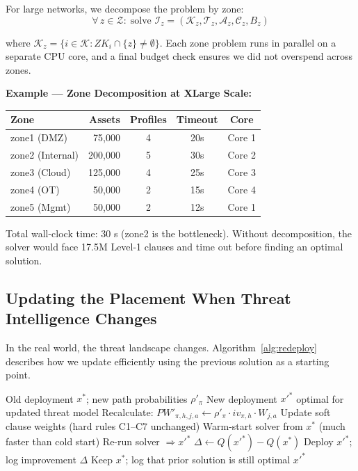 \documentclass[journal]{IEEEtran}
\newcommand{\calK}{\mathcal{K}}
\newcommand{\calT}{\mathcal{T}}
\newcommand{\calA}{\mathcal{A}}
\newcommand{\calZ}{\mathcal{Z}}
\newcommand{\calC}{\mathcal{C}}
\begin{document}
For large networks, we decompose the problem by zone:
\begin{equation}
  \forall\, z \in \calZ:\;
  \text{solve } \mathcal{I}_z = (\calK_z, \calT_z, \calA_z,
  \calC_z, B_z)
\end{equation}

where $\calK_z = \{i \in \calK : ZK_i \cap \{z\} \neq
\emptyset\}$.
Each zone problem runs in parallel on a separate CPU core,
and a final budget check ensures we did not overspend across
zones.

\begin{examplebox}
\textbf{Example --- Zone Decomposition at XLarge Scale:}
\begin{center}
\small
\renewcommand{\arraystretch}{1.1}
\begin{tabular}{@{}lrccc@{}}
\toprule
\textbf{Zone} & \textbf{Assets} & \textbf{Profiles} &
\textbf{Timeout} & \textbf{Core} \\
\midrule
zone1 (DMZ)      &  75,000 & 4 & 20s & Core 1 \\
zone2 (Internal) & 200,000 & 5 & 30s & Core 2 \\
zone3 (Cloud)    & 125,000 & 4 & 25s & Core 3 \\
zone4 (OT)       &  50,000 & 2 & 15s & Core 4 \\
zone5 (Mgmt)     &  50,000 & 2 & 12s & Core 1 \\
\bottomrule
\end{tabular}
\end{center}
Total wall-clock time: 30 s (zone2 is the bottleneck).
Without decomposition, the solver would face 17.5M
Level-1 clauses and time out before finding an optimal
solution.
\end{examplebox}

\subsection{Updating the Placement When Threat Intelligence
            Changes}

In the real world, the threat landscape changes.
Algorithm~\ref{alg:redeploy} describes how we update
efficiently using the previous solution as a starting point.

\begin{algorithm}[htbp]
\caption{Adaptive Redeployment When Threat Priors Change}
\label{alg:redeploy}
\begin{algorithmic}[1]
\REQUIRE Old deployment $x^*$;
         new path probabilities $\rho'_\pi$
\ENSURE  New deployment $x'^*$ optimal for updated threat
         model
\STATE Recalculate:
  $PW'_{\pi,h,j,a} \leftarrow
   \rho'_\pi \cdot iv_{\pi,h} \cdot W_{j,a}$
\STATE Update soft clause weights (hard rules C1--C7
       unchanged)
\STATE Warm-start solver from $x^*$ (much faster than cold
       start)
\STATE Re-run solver $\Rightarrow x'^*$
\STATE $\Delta \leftarrow Q(x'^*) - Q(x^*)$
  \STATE Deploy $x'^*$; log improvement $\Delta$
\ELSE
  \STATE Keep $x^*$; log that prior solution is still optimal
\ENDIF
\RETURN $x'^*$
\end{algorithmic}
\end{algorithm}
\end{document}
